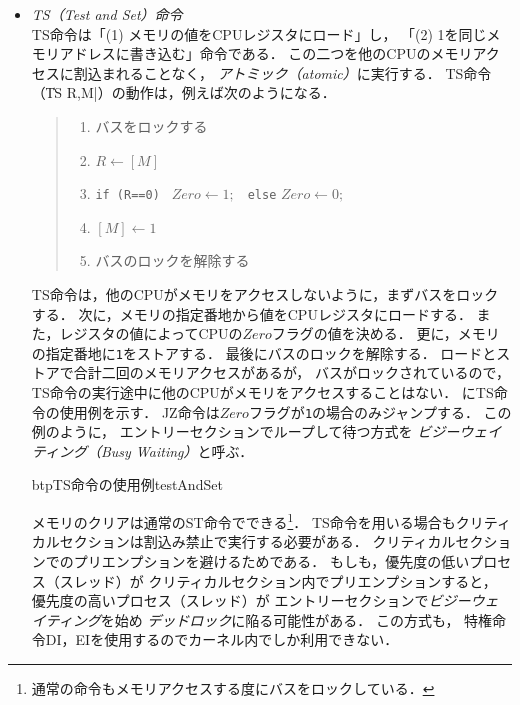 \begin{itemize}
\item \emph{TS（Test and Set）命令} \\
  TS命令は「(1) メモリの値をCPUレジスタにロード」し，
  「(2) 1を同じメモリアドレスに書き込む」命令である．
  この二つを他のCPUのメモリアクセスに割込まれることなく，
  \emph{アトミック（atomic）}に実行する．
  TS命令（\|TS R,M|）の動作は，例えば次のようになる．

  \begin{quote}
    \begin{enumerate}
    \item バスをロックする
    \item $R \leftarrow [M]$
    \item \texttt{if (R==0) } $Zero \leftarrow 1;$
      \texttt{~else} $Zero \leftarrow 0;$
    \item $[M] \leftarrow 1$
    \item バスのロックを解除する
    \end{enumerate}
  \end{quote}

  TS命令は，他のCPUがメモリをアクセスしないように，まずバスをロックする．
  次に，メモリの指定番地から値をCPUレジスタにロードする．
  また，レジスタの値によってCPUの$Zero$フラグの値を決める．
  更に，メモリの指定番地に\texttt{1}をストアする．
  最後にバスのロックを解除する．
  ロードとストアで合計二回のメモリアクセスがあるが，
  バスがロックされているので，
  TS命令の実行途中に他のCPUがメモリをアクセスすることはない．
  にTS命令の使用例を示す．
  JZ命令は$Zero$フラグが\texttt{1}の場合のみジャンプする．
  この例のように，
  エントリーセクションでループして待つ方式を
  \emph{ビジーウェイティング（Busy Waiting）}と呼ぶ．

  \begin{myfig}{btp}{TS命令の使用例}{testAndSet}
    
  \end{myfig}

  メモリのクリアは通常のST命令でできる\footnote{
    通常の命令もメモリアクセスする度にバスをロックしている．}．
  TS命令を用いる場合もクリティカルセクションは割込み禁止で実行する必要がある．
  クリティカルセクションでのプリエンプションを避けるためである．
  もしも，優先度の低いプロセス（スレッド）が
  クリティカルセクション内でプリエンプションすると，
  優先度の高いプロセス（スレッド）が
  エントリーセクションで\emph{ビジーウェイティング}を始め
  \emph{デッドロック}に陥る可能性がある．
  この方式も，
  特権命令DI，EIを使用するのでカーネル内でしか利用できない．


\end{itemize}
